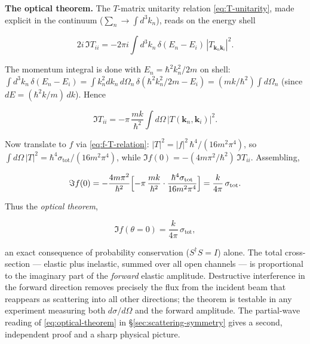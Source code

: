\medskip\noindent\textbf{The optical theorem.}
The $T$-matrix unitarity relation \eqref{eq:T-unitarity}, made explicit in the continuum ($\sum_{n}\to\int d^{3}k_{n}$), reads on the energy shell
\begin{linenomath}
\begin{equation*}
2i\,\Im T_{ii}=-2\pi i\int d^{3}k_{n}\,\delta(E_{n}-E_{i})\,|T_{\bm k_{n}\bm k_{i}}|^{2}.
\end{equation*}
\end{linenomath}
The momentum integral is done with $E_{n}=\hbar^{2}k_{n}^{2}/2m$ on shell:
$\int d^{3}k_{n}\,\delta(E_{n}-E_{i})=\int k_{n}^{2}dk_{n}\,d\Omega_{n}\,\delta(\hbar^{2}k_{n}^{2}/2m-E_{i})=(mk/\hbar^{2})\int d\Omega_{n}$
(since $dE=(\hbar^{2}k/m)\,dk$). Hence
\begin{linenomath}
\begin{equation*}
\Im T_{ii}=-\pi\,\frac{mk}{\hbar^{2}}\int d\Omega\,|T(\bm k_{n},\bm k_{i})|^{2}.
\end{equation*}
\end{linenomath}
Now translate to $f$ via \eqref{eq:f-T-relation}: $|T|^{2}=|f|^{2}\,\hbar^{4}/(16m^{2}\pi^{4})$, so $\int d\Omega\,|T|^{2}=\hbar^{4}\sigma_{\mathrm{tot}}/(16m^{2}\pi^{4})$, while $\Im f(0)=-(4m\pi^{2}/\hbar^{2})\,\Im T_{ii}$. Assembling,
\begin{linenomath}
\begin{equation*}
\Im f(0)=-\frac{4m\pi^{2}}{\hbar^{2}}\Bigl[-\pi\,\frac{mk}{\hbar^{2}}\cdot\frac{\hbar^{4}\sigma_{\mathrm{tot}}}{16m^{2}\pi^{4}}\Bigr]=\frac{k}{4\pi}\,\sigma_{\mathrm{tot}}.
\end{equation*}
\end{linenomath}
Thus the \emph{optical theorem},
\begin{linenomath}
\begin{equation}
\Im f(\theta=0)=\frac{k}{4\pi}\,\sigma_{\mathrm{tot}},
\label{eq:optical-theorem}
\end{equation}
\end{linenomath}
an exact consequence of probability conservation ($S^{\dagger}S=I$) alone. The total cross-section --- elastic plus inelastic, summed over all open channels --- is proportional to the imaginary part of the \emph{forward} elastic amplitude. Destructive interference in the forward direction removes precisely the flux from the incident beam that reappears as scattering into all other directions; the theorem is testable in any experiment measuring both $d\sigma/d\Omega$ and the forward amplitude. The partial-wave reading of \eqref{eq:optical-theorem} in \S\ref{sec:scattering-symmetry} gives a second, independent proof and a sharp physical picture.

